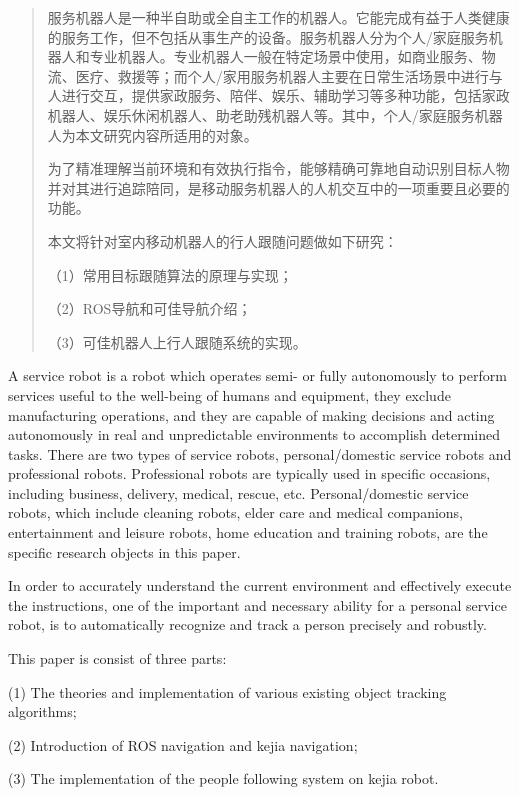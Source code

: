 
\begin{abstract}
  服务机器人是一种半自助或全自主工作的机器人。它能完成有益于人类健康的服务工作，但不包括从事生产的设备。服务机器人分为个人/家庭服务机器人和专业机器人。专业机器人一般在特定场景中使用，如商业服务、物流、医疗、救援等；而个人/家用服务机器人主要在日常生活场景中进行与人进行交互，提供家政服务、陪伴、娱乐、辅助学习等多种功能，包括家政机器人、娱乐休闲机器人、助老助残机器人等。其中，个人/家庭服务机器人为本文研究内容所适用的对象。

  为了精准理解当前环境和有效执行指令，能够精确可靠地自动识别目标人物并对其进行追踪陪同，是移动服务机器人的人机交互中的一项重要且必要的功能。

  本文将针对室内移动机器人的行人跟随问题做如下研究：

  （1）常用目标跟随算法的原理与实现；

  （2）ROS导航和可佳导航介绍；

  （3）可佳机器人上行人跟随系统的实现。

\end{abstract}

\begin{enabstract}
  A service robot is a robot which operates semi- or fully autonomously to perform services useful to the well-being of humans and equipment, they exclude manufacturing operations, and they are capable of making decisions and acting autonomously in real and unpredictable environments to accomplish determined tasks.  There are two types of service robots, personal/domestic service robots and professional robots. Professional robots are typically used in specific occasions, including business, delivery, medical, rescue, etc. Personal/domestic service robots, which include cleaning robots, elder care and medical companions, entertainment and leisure robots, home education and training robots, are the specific research objects in this paper.

  In order to accurately understand the current environment and effectively execute the instructions, one of the important and necessary ability for a personal service robot, is to automatically recognize and track a person precisely and robustly.

  This paper is consist of three parts:

  (1) The theories and implementation of various existing object tracking algorithms;

  (2) Introduction of ROS navigation and kejia navigation;

  (3) The implementation of the people following system on kejia robot.

\end{enabstract}
